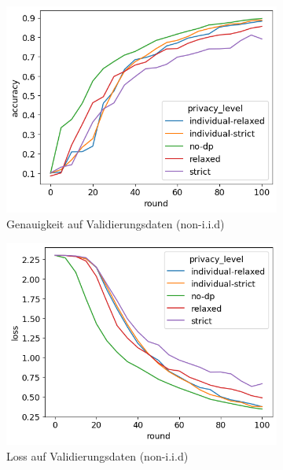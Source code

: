 \begin{figure}[h]
	\centering
	\begin{subfigure}{0.45\textwidth}
		\centering
		\includegraphics[width=\textwidth]{Bilder/emnist-accuracy.png}
		\caption{Genauigkeit auf Validierungsdaten (non-i.i.d)}
	\end{subfigure}
	\begin{subfigure}{0.45\textwidth}
		\centering
		\includegraphics[width=\textwidth]{Bilder/emnist-loss.png}
		\caption{Loss auf Validierungsdaten (non-i.i.d)}
	\end{subfigure}
	\begin{subfigure}{0.45\textwidth}
		\centering

\end{subfigure}
\end{figure}
